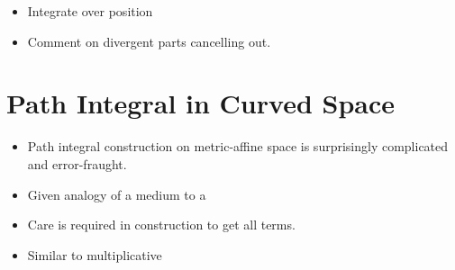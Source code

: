 \begin{itemize}

  \item {Integrate over position}
  \item Comment on divergent parts cancelling out. 
\end{itemize}

\section{Path Integral in Curved Space}

\begin{itemize}
  \item Path integral construction on metric-affine space is surprisingly complicated 
    and error-fraught.  
  \item Given analogy of a medium to a 
  \item Care is required in construction to get all terms.  
  \item Similar to multiplicative 

\end{itemize}


